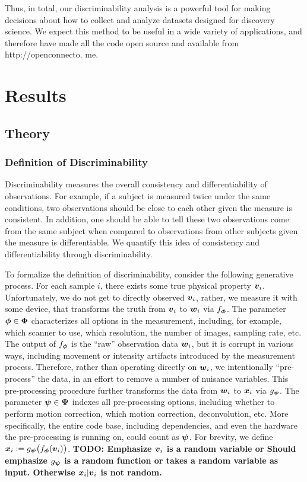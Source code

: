 \documentclass{article}
\begin{document}
Thus, in total, our discriminability analysis is a powerful tool for making decisions about how to collect and analyze
datasets designed for discovery science. We expect this method to be useful in a wide variety of applications,
and therefore have made all the code open source and available from http://openconnecto.
me.




\section{Results}



\subsection{Theory}

\subsubsection{Definition of Discriminability}
 Discriminability measures the overall consistency and differentiability of observations. For example, if a subject is measured twice under the same conditions, two observations should be close to each other given the measure is consistent. In addition, one should be able to tell these two observations come from the same subject when compared to observations from other subjects given the measure is differentiable. We quantify this idea of consistency and differentiability through discriminability. 
 
To formalize the definition of discriminability, consider the following generative process. For each sample $i$, there exists some true physical property $\boldsymbol{v}_i$. Unfortunately, we do not get to directly observed $\boldsymbol{v}_i$, rather, we measure it with some device, that transforms the truth from $\boldsymbol{v}_i$ to $\boldsymbol{w}_i$ via $f_{\boldsymbol{\phi}}$.  The parameter $\boldsymbol{\phi} \in \boldsymbol{\Phi}$ characterizes all options in the measurement, including, for example, which scanner to use, which resolution, the number of images, sampling rate, etc.  The output of $f_{\boldsymbol{\phi}}$ is the  ``raw'' observation data $\boldsymbol{w}_i$, but it is corrupt in various ways, including movement or intensity artifacts introduced by the measurement process.  Therefore, rather than operating directly on $\boldsymbol{w}_i$, we intentionally ``pre-process'' the data, in an effort to remove a number of nuisance variables.  This pre-processing procedure further transforms the data from $\boldsymbol{w}_i$ to $\boldsymbol{x}_i$ via $g_{\boldsymbol{\psi}}$.   The parameter $\boldsymbol{\psi} \in \boldsymbol{\Psi}$ indexes all pre-processing options, including whether to perform motion correction, which motion correction, deconvolution, etc.  More specifically, the entire code base, including dependencies, and even the hardware the pre-processing is running on, could count as $\boldsymbol{\psi}$. For brevity, we define $\boldsymbol{x}_i:= g_{\boldsymbol{\psi}} \big(f_{\boldsymbol{\phi}} (\boldsymbol{v}_i) \big)$. {\bf TODO: Emphasize $\boldsymbol{v}_i$ is a random variable or Should emphasize $g_{\boldsymbol{\psi}}$ is a random function or takes a random variable as input. Otherwise $\boldsymbol{x}_i|\boldsymbol{v}_i$ is not random.}
\end{document}
